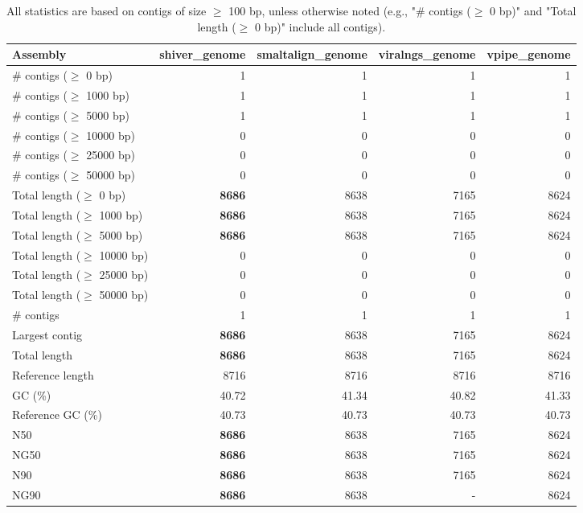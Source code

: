 \documentclass[12pt,a4paper]{article}
\begin{document}
\begin{table}[ht]
\begin{center}
\caption{All statistics are based on contigs of size $\geq$ 100 bp, unless otherwise noted (e.g., "\# contigs ($\geq$ 0 bp)" and "Total length ($\geq$ 0 bp)" include all contigs).}
\begin{tabular}{|l*{4}{|r}|}
\hline
Assembly & shiver\_genome & smaltalign\_genome & viralngs\_genome & vpipe\_genome \\ \hline
\# contigs ($\geq$ 0 bp) & 1 & 1 & 1 & 1 \\ \hline
\# contigs ($\geq$ 1000 bp) & 1 & 1 & 1 & 1 \\ \hline
\# contigs ($\geq$ 5000 bp) & 1 & 1 & 1 & 1 \\ \hline
\# contigs ($\geq$ 10000 bp) & 0 & 0 & 0 & 0 \\ \hline
\# contigs ($\geq$ 25000 bp) & 0 & 0 & 0 & 0 \\ \hline
\# contigs ($\geq$ 50000 bp) & 0 & 0 & 0 & 0 \\ \hline
Total length ($\geq$ 0 bp) & {\bf 8686} & 8638 & 7165 & 8624 \\ \hline
Total length ($\geq$ 1000 bp) & {\bf 8686} & 8638 & 7165 & 8624 \\ \hline
Total length ($\geq$ 5000 bp) & {\bf 8686} & 8638 & 7165 & 8624 \\ \hline
Total length ($\geq$ 10000 bp) & 0 & 0 & 0 & 0 \\ \hline
Total length ($\geq$ 25000 bp) & 0 & 0 & 0 & 0 \\ \hline
Total length ($\geq$ 50000 bp) & 0 & 0 & 0 & 0 \\ \hline
\# contigs & 1 & 1 & 1 & 1 \\ \hline
Largest contig & {\bf 8686} & 8638 & 7165 & 8624 \\ \hline
Total length & {\bf 8686} & 8638 & 7165 & 8624 \\ \hline
Reference length & 8716 & 8716 & 8716 & 8716 \\ \hline
GC (\%) & 40.72 & 41.34 & 40.82 & 41.33 \\ \hline
Reference GC (\%) & 40.73 & 40.73 & 40.73 & 40.73 \\ \hline
N50 & {\bf 8686} & 8638 & 7165 & 8624 \\ \hline
NG50 & {\bf 8686} & 8638 & 7165 & 8624 \\ \hline
N90 & {\bf 8686} & 8638 & 7165 & 8624 \\ \hline
NG90 & {\bf 8686} & 8638 & - & 8624 \\ \hline

\end{tabular}
\end{center}
\end{table}
\end{document}
